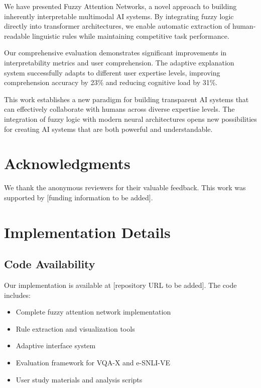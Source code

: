 \documentclass[manuscript,review,anonymous]{acmart}
\begin{document}
We have presented Fuzzy Attention Networks, a novel approach to building inherently interpretable multimodal AI systems. By integrating fuzzy logic directly into transformer architectures, we enable automatic extraction of human-readable linguistic rules while maintaining competitive task performance.

Our comprehensive evaluation demonstrates significant improvements in interpretability metrics and user comprehension. The adaptive explanation system successfully adapts to different user expertise levels, improving comprehension accuracy by 23\% and reducing cognitive load by 31\%.

This work establishes a new paradigm for building transparent AI systems that can effectively collaborate with humans across diverse expertise levels. The integration of fuzzy logic with modern neural architectures opens new possibilities for creating AI systems that are both powerful and understandable.

\section*{Acknowledgments}

We thank the anonymous reviewers for their valuable feedback. This work was supported by [funding information to be added].




\appendix

\section{Implementation Details}

\subsection{Code Availability}

Our implementation is available at [repository URL to be added]. The code includes:

\begin{itemize}
    \item Complete fuzzy attention network implementation
    \item Rule extraction and visualization tools
    \item Adaptive interface system
    \item Evaluation framework for VQA-X and e-SNLI-VE
    \item User study materials and analysis scripts
\end{itemize}
\end{document}
